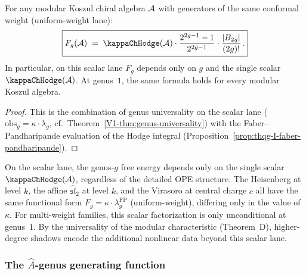 \begin{proposition}
\label{prop:thqg-I-Fg-closed-form}
For any modular Koszul chiral algebra $\mathcal{A}$ with
generators of the same conformal weight (uniform-weight lane):
\begin{equation}%
\boxed{ F_g(\cA) \;=\; \kappaChHodge(\cA) \cdot \frac{2^{2g-1}-1}{2^{2g-1}} \cdot \frac{|B_{2g}|}{(2g)!}\,. }
\end{equation}
In particular, on this scalar lane $F_g$ depends only on $g$
and the single scalar $\kappaChHodge(\cA)$. At genus~$1$, the same formula
holds for every modular Koszul algebra.
\end{proposition}

\begin{proof}
This is the combination of genus universality on the
scalar lane ($\mathrm{obs}_g = \kappa \cdot \lambda_g$, cf.\
Theorem~\ref{V1-thm:genus-universality}) with the
Faber--Pandharipande evaluation of the Hodge integral
\textup{(}Proposition~\ref{prop:thqg-I-faber-pandharipande}\textup{)}.
\end{proof}

\begin{remark}[Universality]
On the scalar lane, the genus-$g$ free energy depends only on
the single scalar $\kappaChHodge(\cA)$, regardless of the detailed OPE
structure. The Heisenberg at level $k$, the affine
$\widehat{\mathfrak{sl}}_2$ at level $k$, and the Virasoro at central
charge $c$ all have the same functional form
$F_g = \kappa \cdot \lambda_g^{\mathrm{FP}}$ \textup{(}uniform-weight\textup{)}, differing only in the
value of $\kappa$. For multi-weight families, this scalar
factorization is only unconditional at genus~$1$. By the
universality of the modular characteristic (Theorem~D), higher-degree
shadows encode the additional nonlinear data beyond this scalar lane.
\end{remark}

\subsubsection{The $\hat{A}$-genus generating function}

